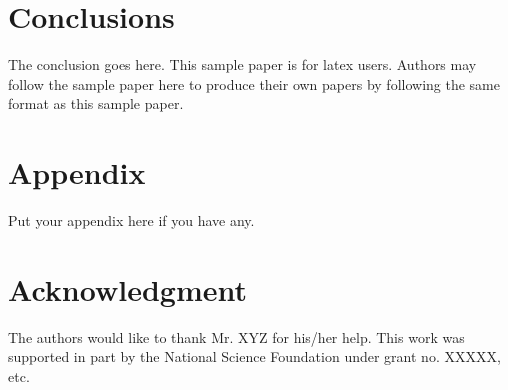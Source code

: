 \section{Conclusions}
The conclusion goes here.
This sample paper is for latex users. Authors may follow the sample paper here to 
produce their own 
papers by following the same format as this sample paper.


\section*{Appendix}
Put your appendix here if you have any.

\section*{Acknowledgment}
The authors would like to thank Mr. XYZ for his/her help.
This work was supported in part by the National Science Foundation
under grant no. XXXXX, etc.
